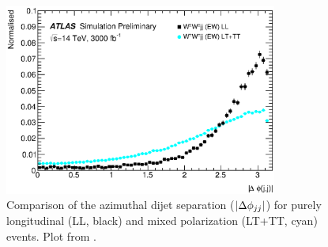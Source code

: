 \begin{figure}[htp]
  \centering
  \includegraphics[width=0.8\textwidth]{figs/ssww_upgrade/polarization/dijet_absdphijj_pass9}
  \caption{Comparison of the azimuthal dijet separation ($|\Delta\phi_{jj}|$) for purely longitudinal (LL, black) and mixed polarization (LT+TT, cyan) \ssww events.  Plot from \cite{2018.ssww-upgrade-support}.}
  \label{fig:polarization_dphijj}
\end{figure}
